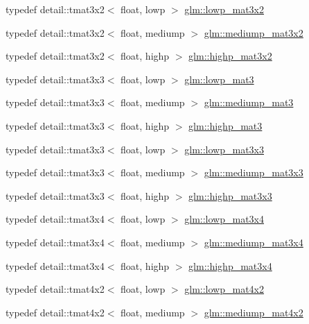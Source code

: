 \begin{DoxyCompactItemize}
\item 
typedef detail\+::tmat3x2$<$ float, lowp $>$ \hyperlink{group__core__precision_ga17219f89f804dbf4620d4caacf32cfe2}{glm\+::lowp\+\_\+mat3x2}
\item 
typedef detail\+::tmat3x2$<$ float, mediump $>$ \hyperlink{group__core__precision_ga1215b70c2750b6e9ab813ced8dcae568}{glm\+::mediump\+\_\+mat3x2}
\item 
typedef detail\+::tmat3x2$<$ float, highp $>$ \hyperlink{group__core__precision_gabc7767293ff69cd56717ee9d8be62963}{glm\+::highp\+\_\+mat3x2}
\item 
typedef detail\+::tmat3x3$<$ float, lowp $>$ \hyperlink{group__core__precision_gaae2935658c6a3668ac1935a7f6064d51}{glm\+::lowp\+\_\+mat3}
\item 
typedef detail\+::tmat3x3$<$ float, mediump $>$ \hyperlink{group__core__precision_gacf45e22f1fb2703b181995676963a1f9}{glm\+::mediump\+\_\+mat3}
\item 
typedef detail\+::tmat3x3$<$ float, highp $>$ \hyperlink{group__core__precision_ga334034520a655db41a2e188951f6aaad}{glm\+::highp\+\_\+mat3}
\item 
typedef detail\+::tmat3x3$<$ float, lowp $>$ \hyperlink{group__core__precision_ga31688b397d10806ead332c3adb7dc0f0}{glm\+::lowp\+\_\+mat3x3}
\item 
typedef detail\+::tmat3x3$<$ float, mediump $>$ \hyperlink{group__core__precision_gae4c7f0d5d3dab712f9a671183e63e5ab}{glm\+::mediump\+\_\+mat3x3}
\item 
typedef detail\+::tmat3x3$<$ float, highp $>$ \hyperlink{group__core__precision_ga8a3703cc71cdfc8928eddf46b3763c4b}{glm\+::highp\+\_\+mat3x3}
\item 
typedef detail\+::tmat3x4$<$ float, lowp $>$ \hyperlink{group__core__precision_ga9cea06e7378fe59abf95c1f56edc4320}{glm\+::lowp\+\_\+mat3x4}
\item 
typedef detail\+::tmat3x4$<$ float, mediump $>$ \hyperlink{group__core__precision_ga5654236019c6a732844da31534a3cf28}{glm\+::mediump\+\_\+mat3x4}
\item 
typedef detail\+::tmat3x4$<$ float, highp $>$ \hyperlink{group__core__precision_gabaf9c8dd35db715b1093042703f879d0}{glm\+::highp\+\_\+mat3x4}
\item 
typedef detail\+::tmat4x2$<$ float, lowp $>$ \hyperlink{group__core__precision_ga2cfe24ae14da17f3510acfc3d03e05a5}{glm\+::lowp\+\_\+mat4x2}
\item 
typedef detail\+::tmat4x2$<$ float, mediump $>$ \hyperlink{group__core__precision_ga5ade2a6a65653683f76988c45da39f15}{glm\+::mediump\+\_\+mat4x2}

\end{DoxyCompactItemize}
